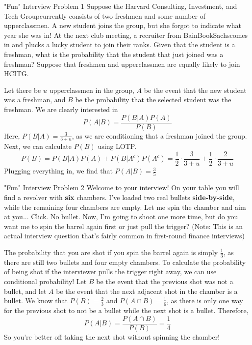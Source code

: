 \documentclass[11pt]{article}
\begin{document}
\begin{exercise}{"Fun" Interview Problem 1}
Suppose the Harvard Consulting, Investment, and Tech Group\texttrademark  currently consists of two freshmen and some number of upperclassmen. A new student joins the group, but she forgot to indicate what year she was in! At the next club meeting, a recruiter from BainBookSachs\texttrademark  comes in and plucks a lucky student to join their ranks. Given that the student is a freshman, what is the probability that the student that just joined was a freshman? Suppose that freshmen and upperclassmen are equally likely to join HCITG. 

\begin{solution}{2}
Let there be $u$ upperclassmen in the group, $A$ be the event that the new student was a freshman, and $B$ be the probability that the selected student was the freshman. We are clearly interested in 
 \[P(A|B) = \frac{P(B|A)P(A)}{P(B)}\]
Here, $P(B|A) = \frac{3}{3+u}$, as we are conditioning that a freshman joined the group. Next, we can calculate $P(B)$ using LOTP. 
    \[P(B) = P(B|A)P(A) + P\left(B|A^c\right)P\left(A^c\right) = \frac{1}{2}\cdot\frac{3}{3+u} + \frac{1}{2}\cdot  \frac{2}{3+u}\]
Plugging everything in, we find that $P(A|B) = \frac{3}{5}$
\end{solution}
\end{exercise}


\begin{exercise}{"Fun" Interview Problem 2}
Welcome to your interview! On your table you will find a revolver with \textbf{six} chambers. I've loaded two real bullets \textbf{side-by-side}, while the remaining four chambers are empty. Let me spin the chamber and aim at you... Click. No bullet. Now, I'm going to shoot one more time, but do you want me to spin the barrel again first or just pull the trigger?  (Note: This is an actual interview question that's fairly common in first-round finance interviews)

\begin{solution}{2}
The probability that you are shot if you spin the barrel again is simply $\frac{1}{3}$, as there are still two bullets and four empty chambers. To calculate the probability of being shot if the interviewer pulls the trigger right away, we can use conditional probability! Let $B$ be the event that the previous shot was not a bullet, and let $A$ be the event that the next adjacent shot in the chamber is a bullet. We know that $P(B) = \frac{2}{3}$ and $P(A \cap B) = \frac{1}{6}$, as there is only one way for the previous shot to not be a bullet while the next shot is a bullet. Therefore, 
    $$P(A|B) = \frac{P(A \cap B)}{P(B)} = \frac{1}{4}$$
So you're better off taking the next shot without spinning the chamber!     
\end{solution}

\end{exercise}
\end{document}
